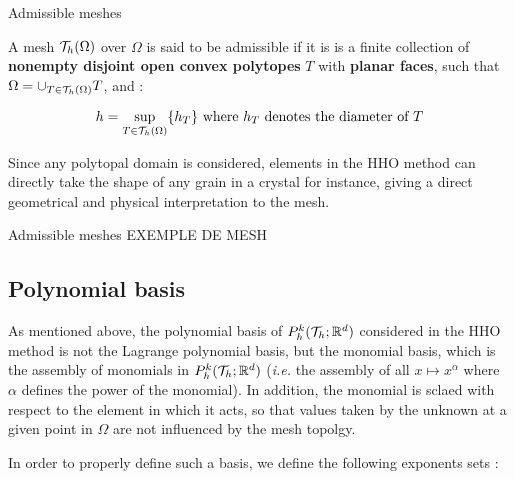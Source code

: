 \documentclass[fleqn]{article}
\begin{document}
      \begin{defbox}{Admissible meshes}

        A mesh $\mathcal{T}_h(\Omega)$ over $\Omega$ is said to be admissible if it is is a finite collection of \textbf{nonempty disjoint open convex polytopes} $T$ with \textbf{planar faces}, such that $\Omega = \cup_{T \in \mathcal{T}_h(\Omega)} T$, and :

        \begin{equation}
          h = \sup_{T \in \mathcal{T}_h(\Omega)} \{ h_T \} \mbox{ where $h_T$ denotes the diameter of $T$}
        \end{equation}

      \end{defbox}

      Since any polytopal domain is considered, elements in the HHO method can directly take the shape of any grain in a crystal for instance, giving a direct geometrical and physical interpretation to the mesh.
      
      \begin{exemplebox}{Admissible meshes}
        EXEMPLE DE MESH
      \end{exemplebox}
  
    \subsection{Polynomial basis}
    \label{sec_polynomial_basis}

        As mentioned above, the polynomial basis of $P^k_h(\mathcal{T}_h; \mathbb{R}^{d})$ considered in the HHO method is not the Lagrange polynomial basis, but the monomial basis, which is the assembly of monomials in $P^k_h(\mathcal{T}_h; \mathbb{R}^{d})$ (\textit{i.e.} the assembly of all $x \mapsto x^{\alpha}$ where $\alpha$ defines the power of the monomial). In addition, the monomial is sclaed with respect to the element in which it acts, so that values taken by the unknown at a given point in $\Omega$ are not influenced by the mesh topolgy.
        \par
        In order to properly define such a basis, we define the following exponents sets :
\end{document}
